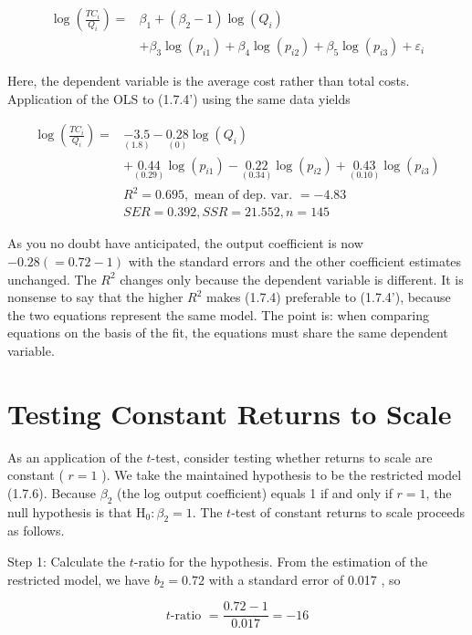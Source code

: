 \documentclass[10pt]{article}
\begin{document}
\begin{align*}
\log \left(\frac{T C_{i}}{Q_{i}}\right)= & \beta_{1}+\left(\beta_{2}-1\right) \log \left(Q_{i}\right) \\
& +\beta_{3} \log \left(p_{i 1}\right)+\beta_{4} \log \left(p_{i 2}\right)+\beta_{5} \log \left(p_{i 3}\right)+\varepsilon_{i} \tag{1.7.4'}
\end{align*}


Here, the dependent variable is the average cost rather than total costs. Application of the OLS to (1.7.4') using the same data yields


\begin{align*}
\log \left(\frac{T C_{i}}{Q_{i}}\right)= & \underset{(1.8)}{-3.5}-\underset{(0)}{0.28} \log \left(Q_{i}\right) \\
& +\underset{(0.29)}{0.44} \log \left(p_{i 1}\right)-\underset{(0.34)}{0.22} \log \left(p_{i 2}\right)+\underset{(0.10)}{0.43} \log \left(p_{i 3}\right) \\
& R^{2}=0.695, \text { mean of dep. var. }=-4.83 \\
& S E R=0.392, S S R=21.552, n=145
\end{align*}


As you no doubt have anticipated, the output coefficient is now $-0.28(=0.72-1)$ with the standard errors and the other coefficient estimates unchanged. The $R^{2}$ changes only because the dependent variable is different. It is nonsense to say that the higher $R^{2}$ makes (1.7.4) preferable to (1.7.4'), because the two equations represent the same model. The point is: when comparing equations on the basis of the fit, the equations must share the same dependent variable.

\section*{Testing Constant Returns to Scale}
As an application of the $t$-test, consider testing whether returns to scale are constant ( $r=1$ ). We take the maintained hypothesis to be the restricted model (1.7.6). Because $\beta_{2}$ (the log output coefficient) equals 1 if and only if $r=1$, the null hypothesis is that $\mathrm{H}_{0}: \beta_{2}=1$. The $t$-test of constant returns to scale proceeds as follows.

Step 1: Calculate the $t$-ratio for the hypothesis. From the estimation of the restricted model, we have $b_{2}=0.72$ with a standard error of 0.017 , so

$$
t \text {-ratio }=\frac{0.72-1}{0.017}=-16
$$
\end{document}
